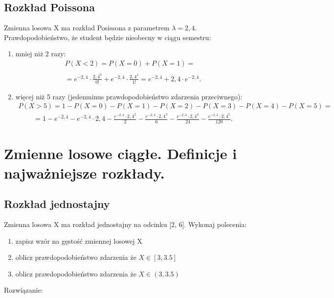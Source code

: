 \documentclass[main.tex]{subfiles}
\begin{document}
    \subsection{Rozkład Poissona}
    \begin{exercise}
        Zmienna losowa X ma rozkład Posissona z parametrem $\lambda = 2,4$. Prawdopodobieństwo, że student będzie nieobecny w ciągu semestru:
    \end{exercise}
    \begin{enumerate}
        \item mniej niż 2 razy:
        \begin{align*}
            P(X<2)=P(X=0)+P(X=1)=\\\\
            =e^{-2,4}\cdot\frac{2,4^0}{0!}+e^{-2,4}\cdot\frac{2,4^1}{1!}=e^{-2,4}+2,4\cdot e^{-2,4}.
        \end{align*}
        \item więcej niż 5 razy (jedenminus prawdopodobieństwo zdarzenia przeciwnego):
        \begin{align*}
            P(X>5)=1-P(X=0)-P(X=1)-P(X=2)-P(X=3)-P(X=4)-P(X=5)=
        \end{align*}
        \begin{align*}
            =1-e^{-2,4}-e^{-2,4}\cdot2,4-\frac{e^{-2,4}\cdot2,4^2}{2}-\frac{e^{-2,4}\cdot2,4^3}{6}-\frac{e^{-2,4}\cdot2,4^4}{24}-\frac{e^{-2,4}\cdot2,4^5}{120}.
        \end{align*}

    \end{enumerate}



    \newpage

    \section{Zmienne losowe ciągłe. Definicje i najważniejsze rozkłady.}

    \subsection{Rozkład jednostajny}
    \begin{exercise}
        Zmienna losowa X ma rozkład jednostajny na odcinku [2, 6]. Wykonaj
        polecenia:
        \begin{enumerate}
            \item zapisz wzór na gęstość zmiennej losowej X
            \item oblicz prawdopodobieństwo zdarzenia że $X\in[3,3.5]$
            \item oblicz prawdopodobieństwo zdarzenia że $X \in (3,3.5)$
        \end{enumerate}
    \end{exercise}
    Rozwiązanie:
\end{document}
